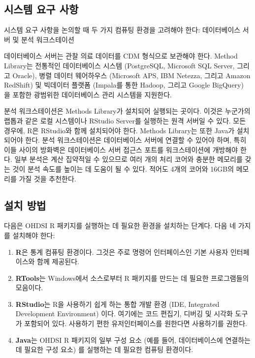 \documentclass[11pt]{book}
\providecommand{\tightlist}{%
  \setlength{\itemsep}{0pt}\setlength{\parskip}{0pt}}
\theoremstyle{definition}
\theoremstyle{definition}
\theoremstyle{definition}
\theoremstyle{remark}
\begin{document}
\subsection{시스템 요구 사항}\label{--}

시스템 요구 사항을 논의할 때 두 가지 컴퓨팅 환경을 고려해야 한다:
데이터베이스 서버 및 분석 워크스테이션 

데이터베이스 서버는 관찰 의료 데이터를 CDM 형식으로 보관해야 한다.
Method Library는 전통적인 데이터베이스 시스템 (PostgreSQL, Microsoft SQL
Server, 그리고 Oracle), 병렬 데이터 웨어하우스 (Microsoft APS, IBM
Netezza, 그리고 Amazon RedShift) 및 빅데이터 플랫폼 (Impala를 통한
Hadoop, 그리고 Google BigQuery) 을 포함한 광범위한 데이터베이스 관리
시스템을 지원한다.

분석 워크스테이션은 Methods Library가 설치되어 실행되는 곳이다. 이것은
누군가의 랩톱과 같은 로컬 시스템이나 RStudio Server를 실행하는 원격
서버일 수 있다. 모든 경우에, R은 RStudio와 함께 설치되어야 한다. Methods
Library는 또한 Java가 설치되어야 한다. 분석 워크스테이션은 데이터베이스
서버에 연결할 수 있어야 하며, 특히 이들 사이의 방화벽은 데이터베이스
서버 접근스 포트를 워크스테이션에 개방해야 한다. 일부 분석은 계산
집약적일 수 있으므로 여러 개의 처리 코어와 충분한 메모리를 갖는 것이
분석 속도를 높이는 데 도움이 될 수 있다. 적어도 4개의 코어와 16GB의
메모리를 가질 것을 추천한다.

\subsection{설치 방법}\label{installR}

다음은 OHDSI R 패키지를 실행하는 데 필요한 환경을 설치하는 단계다. 다음
네 가지를 설치해야 한다: 

\begin{enumerate}
\def\labelenumi{\arabic{enumi}.}
\tightlist
\item
  \textbf{R}은 통계 컴퓨팅 환경이다. 그것은 주로 명령어 인터페이스인
  기본 사용자 인터페이스와 함께 제공된다.
\item
  \textbf{RTools}는 Windows에서 소스로부터 R 패키지를 만드는 데 필요한
  프로그램들의 모음이다.
\item
  \textbf{RStudio}는 R을 사용하기 쉽게 하는 통합 개발 환경 (IDE,
  Integrated Development Environment) 이다. 여기에는 코드 편집기, 디버깅
  및 시각화 도구가 포함되어 있다. 사용하기 편한 유저인터페이스를
  원한다면 사용하기를 권한다.
\item
  \textbf{Java}는 OHDSI R 패키지의 일부 구성 요소 (예를 들어,
  데이터베이스에 연결하는 데 필요한 구성 요소) 를 실행하는 데 필요한
  컴퓨팅 환경이다.
\end{enumerate}
\end{document}
